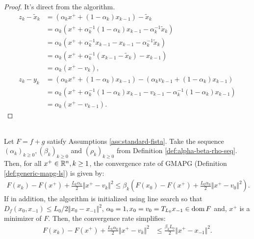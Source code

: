 \documentclass[12pt]{report}
\begin{document}
        \begin{proof}
            It's direct from the algorithm. 
            \begin{align*}
                z_k - \tilde x_k &= (\alpha_k x^+ + (1 - \alpha_k)x_{k - 1}) - \tilde x_k
                \\
                &= \alpha_k (x^+ + \alpha_k^{-1}(1 - \alpha_k)x_{k - 1} - \alpha_k^{-1}\tilde x_k)
                \\
                &= \alpha_k(x^+ + \alpha_k^{-1}x_{k - 1} - x_{k - 1} - \alpha_k^{-1}\tilde x_k)
                \\
                &= \alpha_k(x^+ + \alpha_k^{-1}(x_{k - 1} - \tilde x_k) - x_{k - 1})
                \\
                &= \alpha_k(x^+ - v_{k}), 
                \\
                z_k - y_k &= 
                (\alpha_k x^+ + (1 - \alpha_k)x_{k - 1}) - \left(
                    \alpha_k v_{k - 1} + (1 - \alpha_k)x_{k - 1}
                \right)
                \\
                &= \alpha_k(x^+ + \alpha_k^{-1}(1 - \alpha_k)x_{k - 1} - v_{k - 1} - \alpha_k^{-1}(1 - \alpha_k)x_{k - 1})
                \\
                &= \alpha_k(x^+ - v_{k - 1}). 
            \end{align*}
        \end{proof}
        \begin{theorem}\; \label{thm:gmapg-ls-convergence}\;\\
            Let $F = f + g$ satisfy Assumptions \ref{ass:standard-fista}. 
            Take the sequence $(\alpha_k)_{k \ge 0}, (\beta_k)_{k \ge 0}$ and $(\rho_k)_{k \ge 0}$ from Definition \ref{def:alpha-beta-rho-seq}. 
            Then, for all $x^+ \in \mathbb R^n, k \ge 1$, the convergence rate of GMAPG (Definition \ref{def:generic-mapg-ls}) is given by: 
            \begin{align*}
                F(x_k) - F(x^+) + \frac{L_k\alpha_k}{2}\Vert x^+ - v_k\Vert^2
                \le 
                \beta_k
                \left(
                    F(x_0) - F(x^+) + \frac{L_0\alpha_0}{2} \Vert x^+ - v_0\Vert^2
                \right). 
            \end{align*}
            If in addition, the algorithm is initialized using line search so that \mbox{$D_f(x_0, x_{-1}) \le L_0/2 \Vert x_0 - x_{-1}\Vert^2$}, $\alpha_0 = 1, x_0 = v_0 = T_{L_{0}}x_{-1} \in \operatorname{dom} F$ and, $x^+$ is a minimizer of $F$.
            Then, the convergence rate simplifies: 
            \begin{align*}
                F(x_k) - F(x^+) + \frac{L_k\alpha_k}{2}\Vert x^+ - v_k\Vert^2
                & \le 
                \frac{\beta_kL_0}{2}\Vert x^+ - x_{-1}\Vert^2. 
            \end{align*}
        \end{theorem}
\end{document}
